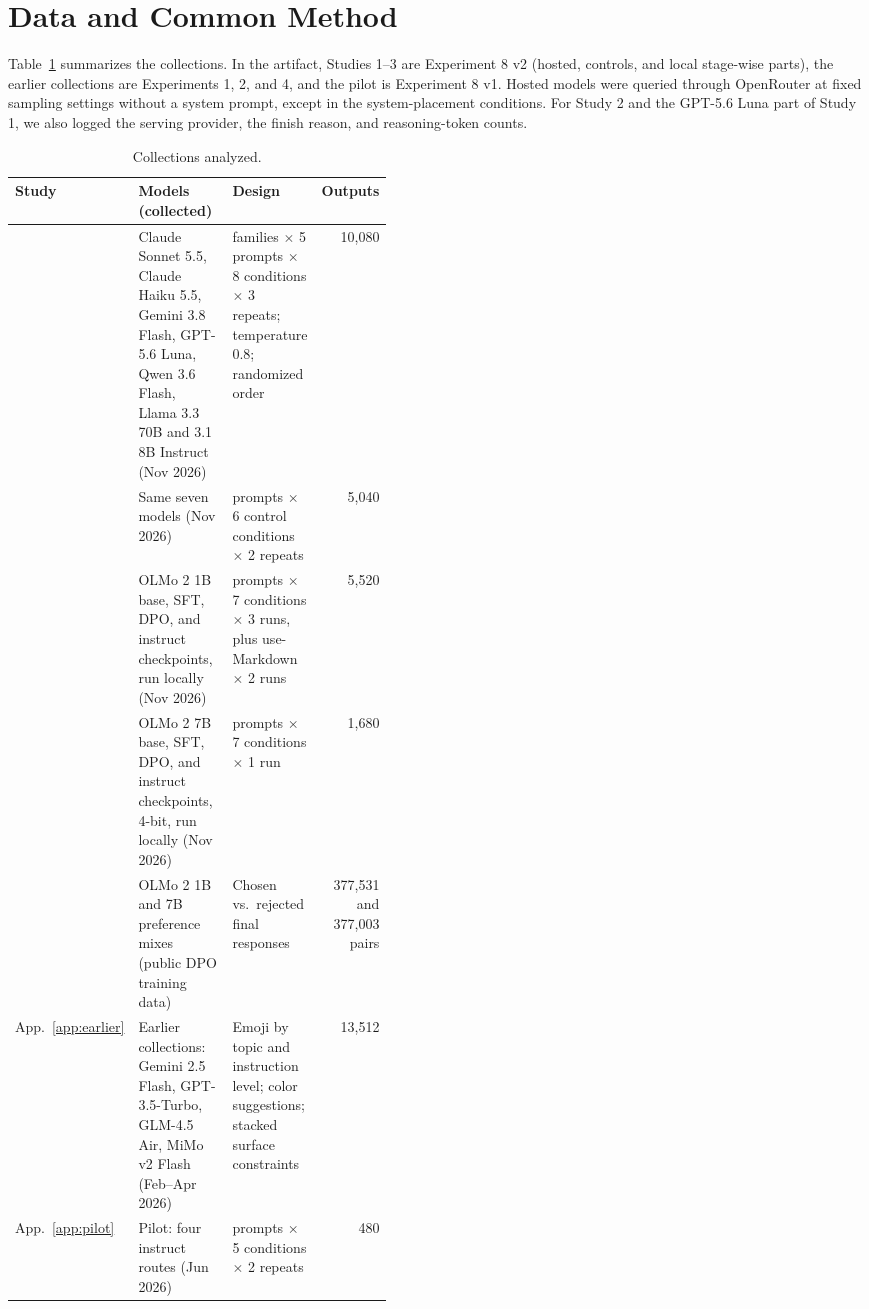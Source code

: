 \documentclass[acmsmall,screen,review,anonymous]{acmart}
\begin{document}
\section{Data and Common Method}
\label{sec:method}

Table~\ref{tab:data} summarizes the collections. In the artifact, Studies 1--3 are Experiment 8 v2 (hosted, controls, and local stage-wise parts), the earlier collections are Experiments 1, 2, and 4, and the pilot is Experiment 8 v1. Hosted models were queried through OpenRouter at fixed sampling settings without a system prompt, except in the system-placement conditions. For Study 2 and the GPT-5.6 Luna part of Study 1, we also logged the serving provider, the finish reason, and reasoning-token counts.

\begin{table}[t]
\centering
\caption{Collections analyzed.}
\label{tab:data}
\begin{tabularx}{\linewidth}{>{\raggedright\arraybackslash}p{0.11\linewidth}>{\raggedright\arraybackslash}p{0.33\linewidth}>{\raggedright\arraybackslash}X r}
\toprule
Study & Models (collected) & Design & Outputs \\
\midrule
1 & Claude Sonnet 5.5, Claude Haiku 5.5, Gemini 3.8 Flash, GPT-5.6 Luna, Qwen 3.6 Flash, Llama 3.3 70B and 3.1 8B Instruct (Nov 2026) & 12 families $\times$ 5 prompts $\times$ 8 conditions $\times$ 3 repeats; temperature 0.8; randomized order & 10,080 \\
2 & Same seven models (Nov 2026) & 60 prompts $\times$ 6 control conditions $\times$ 2 repeats & 5,040 \\
3 & OLMo 2 1B base, SFT, DPO, and instruct checkpoints, run locally (Nov 2026) & 60 prompts $\times$ 7 conditions $\times$ 3 runs, plus use-Markdown $\times$ 2 runs & 5,520 \\
3 & OLMo 2 7B base, SFT, DPO, and instruct checkpoints, 4-bit, run locally (Nov 2026) & 60 prompts $\times$ 7 conditions $\times$ 1 run & 1,680 \\
3 & OLMo 2 1B and 7B preference mixes (public DPO training data) & Chosen vs.\ rejected final responses & 377,531 and 377,003 pairs \\
App.~\ref{app:earlier} & Earlier collections: Gemini 2.5 Flash, GPT-3.5-Turbo, GLM-4.5 Air, MiMo v2 Flash (Feb--Apr 2026) & Emoji by topic and instruction level; color suggestions; stacked surface constraints & 13,512 \\
App.~\ref{app:pilot} & Pilot: four instruct routes (Jun 2026) & 12 prompts $\times$ 5 conditions $\times$ 2 repeats & 480 \\
\bottomrule
\end{tabularx}
\end{table}
\end{document}
